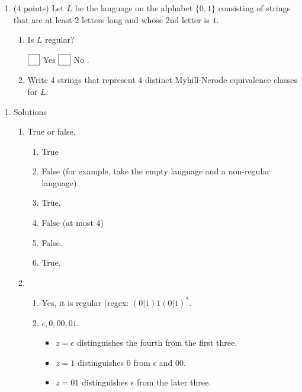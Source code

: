 \documentclass{amsart}
\begin{document}
\begin{enumerate}
\begin{enumerate}
\hfill \(\fbox{\phantom X}\) True \hfill \(\fbox{\phantom X}\) False \hfill.
\end{enumerate}

\item (4 points) Let \(L\) be the language on the alphabet \(\{0,1\}\) consisting of strings that are at least 2 letters long and whose 2nd letter is \(1\).

\begin{enumerate}
\item Is \(L\) regular?

\hfill \(\fbox{\phantom X}\) Yes \hfill \(\fbox{\phantom X}\) No \hfill.

\item Write 4 strings that represent 4 distinct Myhill-Nerode equivalence classes for \(L\).
\begin{workbox}
\vspace{3cm}
\end{workbox}
\end{enumerate}
\end{enumerate}

\newpage
\begin{enumerate}
\item Solutions
\label{sec:org2be8f5d}
\begin{enumerate}
\item True or false.
\begin{enumerate}
\item True
\item False (for example, take the empty language and a non-regular language).
\item True.
\item False (at most 4)
\item False.
\item True.
\end{enumerate}

\item \mbox{}\\
\begin{enumerate}
\item Yes, it is regular (regex: \((0|1)1(0|1)^{*}\).
\item \(\epsilon, 0, 00, 01\).

\begin{itemize}
\item \(z = \epsilon\) distinguishes the fourth from the first three.
\item \(z = 1\) distinguishes \(0\) from \(\epsilon\) and \(00\).
\item \(z = 01\) distinguishes \(\epsilon\) from the later three.
\end{itemize}
\end{enumerate}
\end{enumerate}
\end{enumerate}
\end{document}
